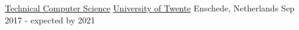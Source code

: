 
    \begin{cventries}

    \cventry
    {\href{https://www.utwente.nl/en/education/bachelor/programmes/technical-computer-science/}{Technical Computer Science}} %
    {\href{https://www.utwente.nl/en}{University of Twente}} %
    {Enschede, Netherlands} %
    {Sep 2017 - expected by 2021} %
    {}

  \end{cventries}

